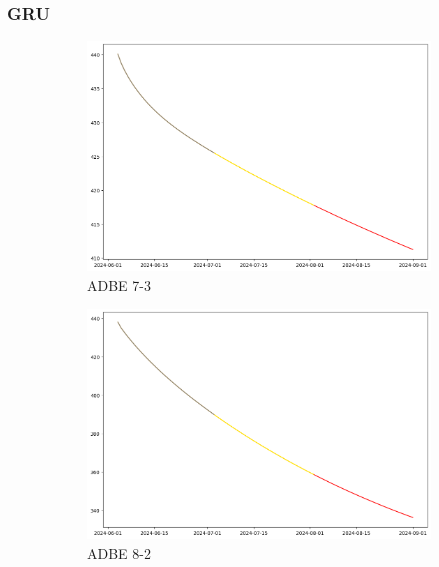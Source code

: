 \documentclass{ieeeojies}
\begin{document}
\subsubsection {GRU}
\begin{figure}[H]
    \centering
    \begin{subfigure}[b]{0.33\linewidth}
        \centering
        \includegraphics[width=\linewidth]{GRU Plot/GRU_ADBE_7_3_90days.png}
        \caption{ADBE 7-3}
        \label{fig:adbe-7-3}
    \end{subfigure}%
    \hfill
    \begin{subfigure}[b]{0.33\linewidth}
        \centering
        \includegraphics[width=\linewidth]{GRU Plot/GRU_ADBE_8_2_90days.png}
        \caption{ADBE 8-2}
        \label{fig:adbe-8-2}
    \end{subfigure}%
    \hfill
    \begin{subfigure}[b]{0.33\linewidth}

\end{subfigure}
\end{figure}
\end{document}
